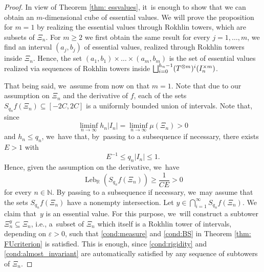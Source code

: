 \documentclass[10pt,a4paper]{amsart}
\let\oldbigsqcup\bigsqcup
\renewcommand{\bigsqcup}{\mathop{\textstyle\oldbigsqcup}\displaylimits}
\let\epsilon\varepsilon
\DeclareMathOperator{\Leb}{Leb}
\theoremstyle{plain}
\theoremstyle{definition}
\newcommand{\N}{\mathbb{N}}
\newcommand{\R}{\mathbb{R}}
\begin{document}
\begin{proof}
In view of Theorem \ref{thm: essvalues}, it~is enough to show that we can
obtain an $m$\nobreakdash-dimensional cube of essential values. We will prove the
proposition for $m=1$ by realizing the essential values through Rokhlin
towers, which are subsets of $\Xi_n$. For $m\ge 2$ we first obtain the
same result for every $j=1,\ldots,m$, \ie we find an interval $(a_j,b_j)$
of essential values, realized through Rokhlin towers inside $\Xi_n$. Hence,
the set $(a_1,b_1)\times\ldots\times(a_m,b_m)$ is the set of essential
values realized via sequences of Rokhlin towers inside
$\bigsqcup_{i=0}^{h_n-1}(T^{\otimes m})^i(I_n^{\times m})$.

That being said, we~assume from now on that $m=1$. Note that due to our assumption on $\Xi_n$ and the derivative of $f$, each of the sets $S_{q_n}f(\Xi_n)\subseteq [-2C,2C]$ is a uniformly bounded union of intervals. Note that, since
\[
\liminf_{n\to\infty} h_n |I_n| = \liminf_{n\to\infty}\mu(\Xi_n) > 0
\]
and $h_n\le q_n$, we~have that, by~passing to a subsequence if necessary, there exists $E>1$ with
\[
E^{-1}\le q_n|I_n|\le 1.
\]
Hence, given the assumption on the derivative, we~have
\[
\Leb_{\R}\left(S_{q_n}f(\Xi_n)\right)\ge \frac{1}{CE}>0
\]
for every $n\in\N$.
By passing to a subsequence if necessary, we~may assume that the sets $S_{q_n}f(\Xi_n)$ have a nonempty intersection. Let $y\in \bigcap_{i=1}^{\infty} S_{q_n}f(\Xi_n)$. We claim that~$y$ is an essential value. For this purpose, we~will construct a subtower $\Xi_{n}^{y}\subseteq \Xi_n$, i.e., a~subset of $\Xi_n$ which itself is a Rokhlin tower of intervals, depending on $\epsilon>0$, such that \eqref{cond:measure} and \eqref{cond:BS} in Theorem \ref{thm: FUcriterion} is satisfied. This is enough, since \eqref{cond:rigidity} and \eqref{cond:almost_invariant} are automatically satisfied by any sequence of subtowers of $\Xi_n$.


\end{proof}
\end{document}
